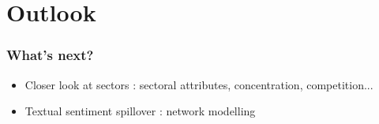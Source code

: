 \section{Outlook}

\begin{frame}
\frametitle{What's next?}
\begin{itemize}
\item Closer look at sectors : sectoral attributes, concentration, competition... 
\item Textual sentiment spillover : network modelling
\end{itemize}
\end{frame}
